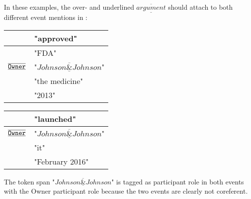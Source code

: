 In these examples, the over- and underlined $\overline{\underline{argument}}$ should attach to both different event mentions in :
\begin{samepage}
\begin{exe}

\ex {} \label{ex:sharedarg1}
    \nopagebreak
    \expl \begin{tabular}{|L{6cm}|L{7cm}|} \hline
         & "approved" \\\hline
         & "FDA" \\
        $\overline{\underline{\texttt{Owner}}}$ & "$\overline{\underline{Johnson\&Johnson}}$" \\
         & "the medicine" \\
         & "2013" \\
        \hline \end{tabular}
    \expl \begin{tabular}{|L{6cm}|L{7cm}|} \hline
         & "launched" \\\hline
        $\overline{\underline{\texttt{Owner}}}$ & "$\overline{\underline{Johnson\&Johnson}}$" \\
         & "it" \\
         & "February 2016" \\\hline \end{tabular}
    \expl The token span "$\overline{\underline{Johnson\&Johnson}}$" is tagged as  participant role in both events with the Owner participant role because the two events are clearly not coreferent.
    

\end{exe}
\end{samepage}
